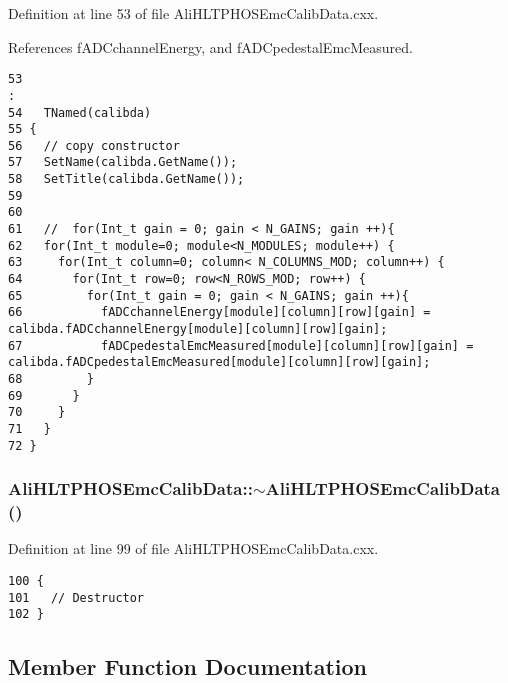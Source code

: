 Definition at line 53 of file Ali\-HLTPHOSEmc\-Calib\-Data.cxx.

References f\-ADCchannel\-Energy, and f\-ADCpedestal\-Emc\-Measured.

\footnotesize\begin{verbatim}53                                                                                     :
54   TNamed(calibda)
55 {
56   // copy constructor
57   SetName(calibda.GetName());
58   SetTitle(calibda.GetName());
59 
60 
61   //  for(Int_t gain = 0; gain < N_GAINS; gain ++){
62   for(Int_t module=0; module<N_MODULES; module++) {
63     for(Int_t column=0; column< N_COLUMNS_MOD; column++) {
64       for(Int_t row=0; row<N_ROWS_MOD; row++) {
65         for(Int_t gain = 0; gain < N_GAINS; gain ++){
66           fADCchannelEnergy[module][column][row][gain] =  calibda.fADCchannelEnergy[module][column][row][gain];
67           fADCpedestalEmcMeasured[module][column][row][gain] = calibda.fADCpedestalEmcMeasured[module][column][row][gain];
68         }
69       }  
70     }
71   }
72 }
\end{verbatim}\normalsize 


\subsubsection{\setlength{\rightskip}{0pt plus 5cm}Ali\-HLTPHOSEmc\-Calib\-Data::$\sim${\bf Ali\-HLTPHOSEmc\-Calib\-Data} ()\hspace{0.3cm}{\tt  [virtual]}}\label{classAliHLTPHOSEmcCalibData_AliHLTPHOSEmcCalibDataa4}




Definition at line 99 of file Ali\-HLTPHOSEmc\-Calib\-Data.cxx.

\footnotesize\begin{verbatim}100 {
101   // Destructor
102 }
\end{verbatim}\normalsize 




\subsection{Member Function Documentation}
